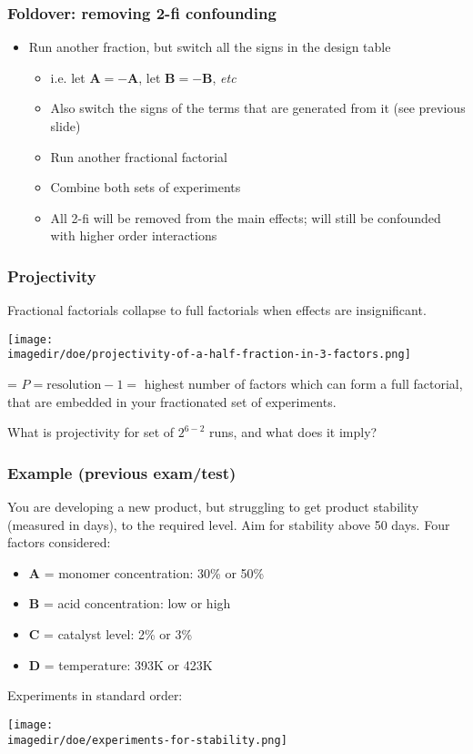 \begin{frame}\frametitle{Foldover: removing 2-fi confounding}
	\begin{itemize}
		\item	Run another fraction, but switch all the signs in the design table
		\begin{itemize}
			\item	i.e. let $\mathbf{A} = \mathbf{-A}$, let $\mathbf{B} = \mathbf{-B}$, \emph{etc}
			\item	Also switch the signs of the terms that are generated from it (see previous slide)
			\item	Run another fractional factorial
			\item	Combine both sets of experiments
			\item	All 2-fi will be removed from the main effects; will still be confounded with higher order interactions
		\end{itemize}
	\end{itemize}
\end{frame}

\begin{frame}\frametitle{Projectivity}

	Fractional factorials collapse to full factorials when effects are insignificant.
	\begin{center}
		\texttt{[image: \\imagedir/doe/projectivity-of-a-half-fraction-in-3-factors.png]}
	\end{center}
	{\color{purple}{Projectivity}} = $P = \text{resolution} - 1 =$ highest number of factors which can form a full factorial, that are embedded in your fractionated set of experiments.
	
	\vspace{12pt}
	What is projectivity for set of $2^{6-2}$ runs, and what does it imply?
\end{frame}

\begin{frame}\frametitle{Example (previous exam/test)}

	You are developing a new product, but struggling to get product stability (measured in days), to the required level. Aim for stability above 50 days. Four factors considered:
	\begin{itemize}
		\item	\textbf{A} = monomer concentration: 30\% or 50\%
		\item	\textbf{B} = acid concentration: low or high
		\item	\textbf{C} = catalyst level: 2\% or 3\%
		\item	\textbf{D} = temperature: 393K or 423K
	\end{itemize}

	Experiments in standard order:
	\begin{center}
		\texttt{[image: \\imagedir/doe/experiments-for-stability.png]}
	\end{center}
\end{frame}

